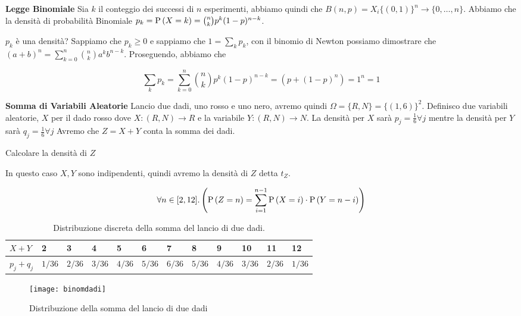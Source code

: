 \begin{defn}
    \textbf{Legge Binomiale} 
    Sia $ k $ il conteggio dei successi di $ n $ esperimenti, abbiamo quindi che $ B(n,p) = X_i\{(0,1)\}^n \to \{0, \dots, n\} $. Abbiamo che la densità di probabilità Binomiale $ p_k = \text{P}\left(X=k\right) = \binom{n}{k} p^k(1-p)^{n-k} $.
    
    $ p_k $ è una densità? Sappiamo che $ p_k \geq 0 $ e sappiamo che $ 1 = \sum_{k} p_k $, con il binomio di Newton possiamo dimostrare che $ (a+b)^n = \sum_{k=0}^{n} \binom{n}{k} a^k b^{n-k} $. Proseguendo, abbiamo che 
    
    \begin{equation*}
        \sum_{k} p_k = \sum_{k=0}^{n} \binom{n}{k} p^k (1-p)^{n-k} = (p+(1-p)^n) = 1^n = 1
    \end{equation*}
\end{defn}

\begin{defn}
    \textbf{Somma di Variabili Aleatorie}
    Lancio due dadi, uno rosso e uno nero, avremo quindi $ \Omega = \{R, N\} = \{(1,6)\}^2 $. Definisco due variabili aleatorie, $ X $ per il dado rosso dove $ X : (R, N) \to R $ e la variabile $ Y : (R, N) \to N $. La densità per $ X $ sarà $ p_j = \frac{1}{6} \forall j $ mentre la densità per $ Y $ sarà $ q_j = \frac{1}{6} \forall j $
    Avremo che $ Z = X + Y $ conta la somma dei dadi.
\end{defn}

\begin{exmp}
    Calcolare la densità di $ Z $
    
    In questo caso $ X, Y $ sono indipendenti, quindi avremo la densità di $ Z $ detta $ t_Z $.

    \begin{equation*}
    \forall n \in [2, 12] .  \left( \text{P}\left(Z = n\right) = \sum_{i=1}^{n-1} \text{P}\left(X = i\right) \cdot \text{P}\left(Y = n - i\right) \right)
    \end{equation*}
    
    \begin{table}[H]
        \centering
        \caption{Distribuzione discreta della somma del lancio di due dadi.}
        \label{tab:distribdice1}
        \begin{tabular}{|l|l|l|l|l|l|l|l|l|l|l|l|}
            \hline
            $ X + Y $     & 2        & 3        & 4        & 5        & 6        & 7        & 8        & 9        & 10       & 11       & 12       \\ \hline
            $ p_j + q_j $ & $ 1/36 $ & $ 2/36 $ & $ 3/36 $ & $ 4/36 $ & $ 5/36 $ & $ 6/36 $ & $ 5/36 $ & $ 4/36 $ & $ 3/36 $ & $ 2/36 $ & $ 1/36 $ \\ \hline
        \end{tabular}
    \end{table}

    \begin{figure}[H]
        \centering
        \caption{Distribuzione della somma del lancio di due dadi}
        \texttt{[image: binomdadi]}
    \end{figure}
\end{exmp}

